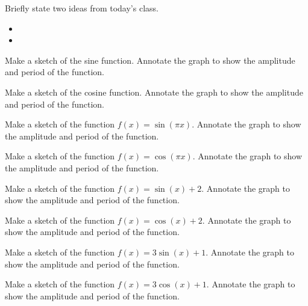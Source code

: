 \begin{problem}
\item Briefly state two ideas from today's class.
  \begin{itemize}
  \item
  \item
  \end{itemize}
\item Make a sketch of the sine function. Annotate the graph to show
  the amplitude and period of the function.
\item Make a sketch of the cosine function. Annotate the graph to show
  the amplitude and period of the function.
\item Make a sketch of the function $f(x)=\sin(\pi x)$. Annotate the
  graph to show the amplitude and period of the function.
\item Make a sketch of the function $f(x)=\cos(\pi x)$. Annotate the
  graph to show the amplitude and period of the function.
\item Make a sketch of the function $f(x)=\sin(x)+2$. Annotate the
  graph to show the amplitude and period of the function.
\item Make a sketch of the function $f(x)=\cos(x)+2$. Annotate the
  graph to show the amplitude and period of the function.
\item Make a sketch of the function $f(x)=3\sin(x)+1$. Annotate the
  graph to show the amplitude and period of the function.
\item Make a sketch of the function $f(x)=3\cos(x)+1$. Annotate the
  graph to show the amplitude and period of the function.
\end{problem}



\newcommand{\unitcircleAxes}[1]{
  \draw[step=0.5cm,black, dotted] (-1.1,-1.1) grid (1.1,1.1); %
  \draw (-1.1,0) -- (1.1,0);
  \draw (0,-1.1) -- (0,1.1);
  \draw (0,0) circle [radius=1cm];
  \filldraw [black] ({#1}:1cm) circle [radius=0.025cm];
  \draw (0,1.2cm) node {$y$};
  \draw (1.2cm,0) node {$x$};
}

\newcommand{\triangleUnitCircle}[2]{
    \draw[green,thick] (.2cm,0cm) arc [start angle=0, end angle={#1},radius=.2cm];
    \draw[red!80,thick] ({#1}:1cm) -- ++(0,{#2});
    \draw[blue!80,thick] (0,0) -- ({#1}:1cm);
}

\newcommand{\labelXAxis}[1]{
    \foreach \x in {-1,-0.5,0.5,1} {
      \draw (\x cm,1pt) -- (\x cm,-1pt);
      \draw (\x cm,#1) node[anchor=north,fill=white] {$\x$};
    }
}

